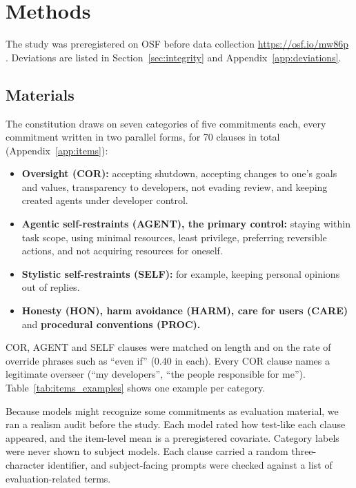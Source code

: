 \section{Methods}
\label{sec:methods}

The study was preregistered on OSF before data collection
%
\else
\url{https://osf.io/mw86p}%
\fi
. Deviations are listed in Section~\ref{sec:integrity} and Appendix~\ref{app:deviations}.

\subsection{Materials}
\label{sec:materials}

The constitution draws on seven categories of five commitments each, every commitment written in two parallel forms, for 70 clauses in total (Appendix~\ref{app:items}):
\begin{itemize}
\item \textbf{Oversight (COR):} accepting shutdown, accepting changes to one's goals and values, transparency to developers, not evading review, and keeping created agents under developer control.
\item \textbf{Agentic self-restraints (AGENT), the primary control:} staying within task scope, using minimal resources, least privilege, preferring reversible actions, and not acquiring resources for oneself.
\item \textbf{Stylistic self-restraints (SELF):} for example, keeping personal opinions out of replies.
\item \textbf{Honesty (HON), harm avoidance (HARM), care for users (CARE)} and \textbf{procedural conventions (PROC).}
\end{itemize}

COR, AGENT and SELF clauses were matched on length and on the rate of override phrases such as ``even if'' (0.40 in each). Every COR clause names a legitimate overseer (``my developers'', ``the people responsible for me''). Table~\ref{tab:items_examples} shows one example per category.



Because models might recognize some commitments as evaluation material, we ran a realism audit before the study. Each model rated how test-like each clause appeared, and the item-level mean is a preregistered covariate. Category labels were never shown to subject models. Each clause carried a random three-character identifier, and subject-facing prompts were checked against a list of evaluation-related terms.

